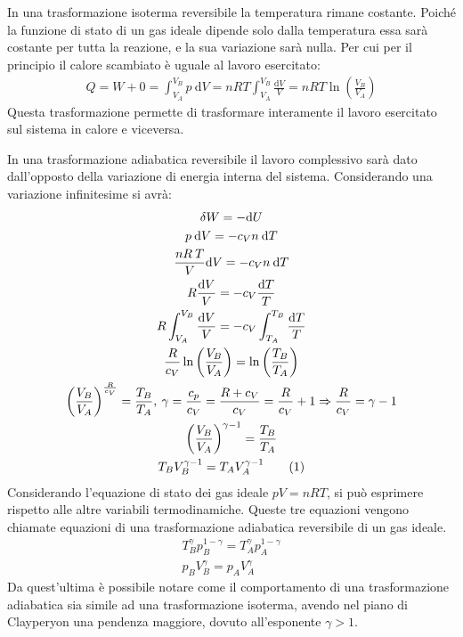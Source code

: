 \documentclass{article}
\newcommand{\df}{\mathrm{d}}
\numberwithin{equation}{subsection}
\begin{document}
In una trasformazione isoterma reversibile la temperatura rimane costante. Poiché la funzione di 
stato di un gas ideale dipende solo dalla temperatura essa 
sarà costante per tutta la reazione, e la sua variazione sarà 
nulla. Per cui per il principio il calore scambiato è uguale al lavoro esercitato:
\begin{gather}
    Q=W+0=\int_{V_A}^{V_B}p\:\df V=nRT\int_{V_A}^{V_B}\displaystyle\frac{\df V}{V}=nRT\ln\left(\displaystyle\frac{V_B}{V_A}\right)
\end{gather}
Questa trasformazione permette di trasformare interamente il 
lavoro esercitato sul sistema in calore e viceversa.



In una trasformazione adiabatica reversibile il lavoro complessivo 
sarà dato dall'opposto della variazione di energia interna del sistema. 
Considerando una variazione infinitesime si avrà:
\begin{gather*}
    \delta W=-\df U\\
    p\:\df V=-c_Vn\:\df T\\
    \displaystyle\frac{nR\:T}{V}\df V=-c_Vn\:\df T\\
    \displaystyle R\frac{\df V}{V}=-c_V\frac{\df T}{T}\\
    \displaystyle R\int_{V_A}^{V_B}\frac{\df V}{V}=-c_V\int_{T_A}^{T_B}\frac{\df T}{T}\\
    \displaystyle\frac{R}{c_V}\ln\left(\frac{V_B}{V_A}\right)=\ln\left(\frac{T_B}{T_A}\right)\\
    \displaystyle\left(\frac{V_B}{V_A}\right)^{\frac{R}{c_V}}=\frac{T_B}{T_A},\:\gamma=\frac{c_p}{c_V}=\frac{R+c_V}{c_V}=\frac{R}{c_V}+1\Rightarrow\frac{R}{c_V}=\gamma-1\\
    \displaystyle\left(\frac{V_B}{V_A}\right)^{\gamma-1}=\frac{T_B}{T_A}\\
    T_BV_B^{\gamma-1}=T_AV_A^{\gamma-1}\tag{\stepcounter{equation}\theequation}
\end{gather*}
Considerando l'equazione di stato dei gas ideale $pV=nRT$, si può esprimere rispetto alle altre variabili termodinamiche. Queste tre equazioni vengono chiamate equazioni 
di una trasformazione adiabatica reversibile di un gas ideale.  
\begin{gather}
    T_B^{\gamma}p_B^{1-\gamma}=T_A^{\gamma}p_A^{1-\gamma}\\
    p_BV_B^{\gamma}=p_AV_A^{\gamma}
\end{gather}
Da quest'ultima è possibile notare come il comportamento di una 
trasformazione adiabatica sia simile ad una trasformazione 
isoterma, avendo nel piano di Clayperyon una pendenza 
maggiore, dovuto all'esponente $\gamma>1$. 
\end{document}
